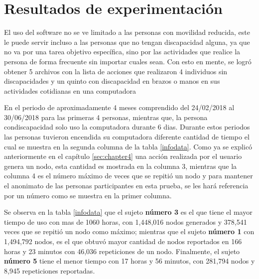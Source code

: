 \section{Resultados de experimentaci\'on}

El uso del software no se ve limitado a las personas con movilidad reducida,
 este le puede servir incluso a las personas que no tengan discapacidad 
 alguna, ya que no va por una tarea objetivo espec\'ifica, sino por las 
 actividades que realice la persona de forma frecuente sin importar cuales 
 sean. Con esto en mente, se logr\'o obtener 5 archivos con la lista de 
 acciones que realizaron 4 individuos sin discapacidades y un quinto con 
 discapacidad en brazos o manos en sus actividades cotidianas en una 
 computadora


En el periodo de aproximadamente 4 meses comprendido del 24/02/2018 al 
 30/06/2018 para las primeras 4 personas, mientras que, la persona 
 condiscapacidad solo uso la computadora durante 6 dias. Durante estos 
 periodos las personas tuvieron encendida su computadora diferente cantidad 
 de tiempo el cual se muestra en la segunda columna de la tabla 
 \ref{infodata}. Como ya se explic\'o anteriormente en el cap\'itulo 
 \ref{sec:chapter4} una acci\'on realizada por el usuario genera un nodo, 
 esta cantidad es mostrada en la columna 3, mientras que la columna 4 es el 
 n\'umero m\'aximo de veces que se repiti\'o un nodo y para mantener el 
 anonimato de las personas participantes en esta prueba, se les har\'a 
 referencia por un n\'umero como se muestra en la primer columna. 

Se observa en la tabla \ref{infodata} que el sujeto \textbf{n\'umero 3}
 es el que tiene el mayor tiempo de uso con mas de 1060 horas, con
 1,448,016 nodos generados y 378,541 veces que se repiti\'o un nodo como 
 m\'aximo; mientras que el sujeto \textbf{n\'umero 1} con 1,494,792 nodos, es 
 el que obtuv\'o mayor cantidad de nodos reportados en 166 horas y 23 minutos 
 con 46,036 repeticiones de un nodo. Finalmente, el sujeto \textbf{n\'umero 
 5} tiene el menor tiempo con 17 horas y 56 minutos, con 281,794 nodos y 
 8,945 repeticiones reportadas.


